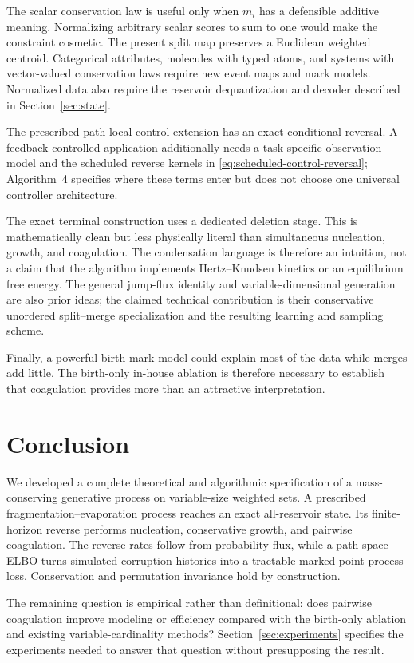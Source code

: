 \documentclass[10pt]{article}
\theoremstyle{definition}
\theoremstyle{remark}
\begin{document}
The scalar conservation law is useful only when $m_i$ has a defensible
additive meaning.  Normalizing arbitrary scalar scores to sum to one would make
the constraint cosmetic.  The present split map preserves a Euclidean
weighted centroid.  Categorical attributes, molecules with typed atoms, and
systems with vector-valued conservation laws require new event maps and mark
models.  Normalized data also require the reservoir dequantization and
decoder described in Section~\ref{sec:state}.

The prescribed-path local-control extension has an exact conditional
reversal.  A feedback-controlled application additionally needs a
task-specific observation model and the scheduled reverse kernels in
\eqref{eq:scheduled-control-reversal}; Algorithm~4 specifies where these
terms enter but does not choose one universal controller architecture.

The exact terminal construction uses a dedicated deletion stage.  This is
mathematically clean but less physically literal than simultaneous
nucleation, growth, and coagulation.  The condensation language is therefore
an intuition, not a claim that the algorithm implements Hertz--Knudsen
kinetics or an equilibrium free energy.  The general jump-flux identity and
variable-dimensional generation are also prior ideas; the claimed technical
contribution is their conservative unordered split--merge specialization and
the resulting learning and sampling scheme.

Finally, a powerful birth-mark model could explain most of the data while
merges add little.  The birth-only in-house ablation is therefore necessary
to establish that coagulation provides more than an attractive
interpretation.

\section{Conclusion}

We developed a complete theoretical and algorithmic specification of a mass-conserving generative process on variable-size weighted sets.  A prescribed fragmentation--evaporation process reaches an exact all-reservoir state.  Its finite-horizon reverse performs nucleation, conservative growth, and pairwise coagulation.  The reverse rates follow from probability flux, while a path-space ELBO turns simulated corruption histories into a tractable marked point-process loss.  Conservation and permutation invariance hold by construction.

The remaining question is empirical rather than definitional: does pairwise
coagulation improve modeling or efficiency compared with the birth-only
ablation and existing variable-cardinality methods?  Section~\ref{sec:experiments}
specifies the experiments needed to answer that question without
presupposing the result.
\end{document}
